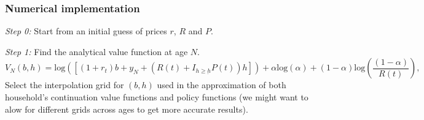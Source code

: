 \documentclass[a4paper,10pt]{article}
\newif\iffudongxingtongonly
\begin{document}
\iffudongxingtongonly

\subsubsection*{Numerical implementation}

\noindent \emph{Step 0:} Start from an initial guess of prices $r$, $R$ and $P$.
\vspace{2 mm}

\noindent \emph{Step 1:} Find the analytical value function at age $N$.
\[
V_N(b,h) = \mbox{log}([(1+r_t)b+y_N+(R(t)+I_{h\ge\underbar{h}} P(t))h])+\alpha\mbox{log}(\alpha)+(1-\alpha)\mbox{log}(\frac{(1-\alpha)}{R(t)}),
\]
Select the interpolation grid for $(b,h)$ used in the approximation of both household's continuation value functions and policy functions (we might want to alow for different grids across ages to get more accurate results).
\vspace{2 mm}
\end{document}
